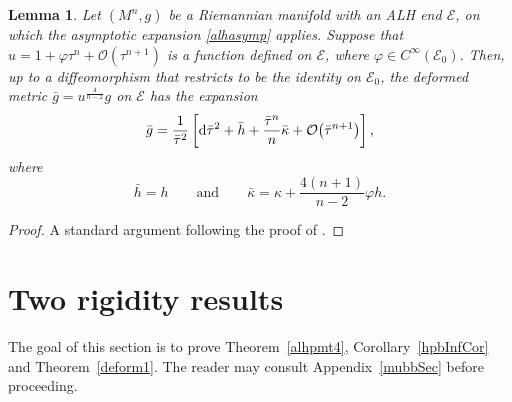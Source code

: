 \documentclass[10pt,a4paper]{amsart}
\numberwithin{equation}{section}
\newtheorem{Lemma}[Theorem]{Lemma}
\def\Ecal{\mathcal{E}}
\def\Ocal{\mathcal{O}}
\def\ed{{\rm d}}
\begin{document}
\begin{Lemma}\label{confdeformmass}	
	Let $(M^n,g)$ be a Riemannian manifold with an ALH end $\Ecal$,
	on which the asymptotic expansion \eqref{alhasymp} applies.
	Suppose that $u = 1+\varphi \tau^n + \Ocal(\tau^{n+1})$
	is a function defined on $\Ecal$, where $\varphi\in C^\infty(\Ecal_0)$.
	Then, up to a diffeomorphism that restricts to be the identity on $\Ecal_0$, the
	deformed metric $\bar g = u^{\frac{4}{n-2}} g$ on $\Ecal$
	has the expansion
	\begin{equation*}%
		\bar g = \frac{1}{\bar\tau^2}
			\left[ \ed\bar\tau^2 + \bar h + \frac{\bar\tau^n}{n}\bar\kappa
			+ \Ocal\bigl(\bar\tau^{n+1}\bigr)\right],
	\end{equation*}
	where
	\begin{equation*}
		\bar h = h\qquad\mbox{and}\qquad
		\bar \kappa = \kappa + \frac{4(n+1)}{n-2}\varphi h.
	\end{equation*}	
\end{Lemma}
\begin{proof}
	A standard argument following the proof of  \cite[Lemma 6.5]{BQ08}.
\end{proof}


\section{Two rigidity results}\label{Two_rigibility}
The goal of this section is to prove Theorem~\ref{alhpmt4}, Corollary~\ref{hpbInfCor} and Theorem~\ref{deform1}.
The reader may consult Appendix~\ref{mubbSec} before proceeding.
\end{document}
